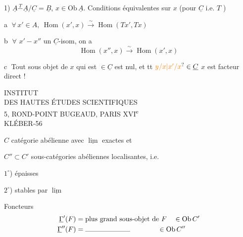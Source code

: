 
1) $\underline A\overset{T}{-}\underline A/\underline C=\underline B$, $x\in\mathrm{Ob}\,\underline A$. Conditions équivalentes sur $x$ (pour $\underline C$ i.e. $T$ )

\textcircled{a} $\forall\,x'\in A,\ \operatorname{Hom}(x',x)\xrightarrow{\sim}\operatorname{Hom}(Tx',Tx)$

\textcircled{b} $\forall$ $x'-x''$ un $\underline C$-isom, on a
\[
\operatorname{Hom}(x'',x)\xrightarrow{\sim}\operatorname{Hom}(x',x)
\]


\textcircled{c} Tout sous objet de $x$ qui est $\in\underline C$ est nul, et  tt   $\unsure{y/x|x'/x}\in\underline C$  $x$ est facteur direct !

\begin{center}
INSTITUT\\
DES HAUTES ÉTUDES SCIENTIFIQUES\\
5, ROND-POINT BUGEAUD, PARIS XVI\textsuperscript{e}\\
KLÉBER-56
\end{center}

$C$ catégorie abélienne avec $\underline{\lim}$ exactes et 

$C''\subset C'$ sous-catégories abéliennes localisantes, i.e.

$1^\circ$) épaisses

$2^\circ$) stables par $\underline{\lim}$

Foncteurs
\[
\begin{aligned}
\underline{\Gamma}'(F)&=\text{plus grand sous-objet de }F\quad\in\mathrm{Ob}\,C'\\
\underline{\Gamma}''(F)&=\rule{6.5em}{.3pt}\qquad\qquad\in\mathrm{Ob}\,C''
\end{aligned}
\]


